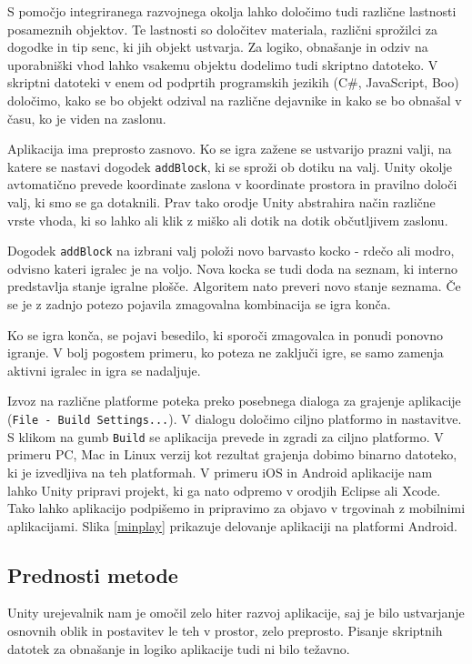 S pomočjo integriranega razvojnega okolja lahko določimo tudi različne lastnosti posameznih objektov. Te lastnosti so določitev materiala, različni sprožilci za dogodke in tip senc, ki jih objekt ustvarja. Za logiko, obnašanje in odziv na uporabniški vhod lahko vsakemu objektu dodelimo tudi skriptno datoteko. V skriptni datoteki v enem od podprtih programskih jezikih (C\#, JavaScript, Boo) določimo, kako se bo objekt odzival na različne dejavnike in kako se bo obnašal v času, ko je viden na zaslonu.

Aplikacija ima preprosto zasnovo. Ko se igra zažene se ustvarijo prazni valji, na katere se nastavi dogodek \texttt{addBlock}, ki se sproži ob dotiku na valj. Unity okolje avtomatično prevede koordinate zaslona v koordinate prostora in pravilno določi valj, ki smo se ga dotaknili. Prav tako orodje Unity abstrahira način različne vrste vhoda, ki so lahko ali klik z miško ali dotik na dotik občutljivem zaslonu.

Dogodek \texttt{addBlock} na izbrani valj položi novo barvasto kocko - rdečo ali modro, odvisno kateri igralec je na voljo. Nova kocka se tudi doda na seznam, ki interno predstavlja stanje igralne plošče. Algoritem nato preveri novo stanje seznama. Če se je z zadnjo potezo pojavila zmagovalna kombinacija se igra konča.

Ko se igra konča, se pojavi besedilo, ki sporoči zmagovalca in ponudi ponovno igranje. V bolj pogostem primeru, ko poteza ne zaključi igre, se samo zamenja aktivni igralec in igra se nadaljuje. 

Izvoz na različne platforme poteka preko posebnega dialoga za grajenje aplikacije (\texttt{File - Build Settings...}). V dialogu določimo ciljno platformo in nastavitve. S klikom na gumb \texttt{Build} se aplikacija prevede in zgradi za ciljno platformo. V primeru PC, Mac in Linux verzij kot rezultat grajenja dobimo binarno datoteko, ki je izvedljiva na teh platformah. V primeru iOS in Android aplikacije nam lahko Unity pripravi projekt, ki ga nato odpremo v orodjih Eclipse ali Xcode. Tako lahko aplikacijo podpišemo in pripravimo za objavo v trgovinah z mobilnimi aplikacijami. Slika \ref{minplay} prikazuje delovanje aplikaciji na platformi Android.

\subsection{Prednosti metode}

Unity urejevalnik nam je omočil zelo hiter razvoj aplikacije, saj je bilo ustvarjanje osnovnih oblik in postavitev le teh v prostor, zelo preprosto. Pisanje skriptnih datotek za obnašanje in logiko aplikacije tudi ni bilo težavno.

